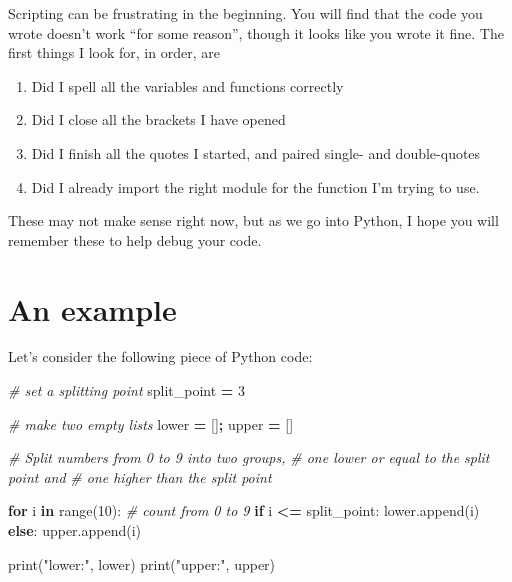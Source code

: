 \documentclass[
  letterpaper,
]{scrbook}
\newenvironment{Shaded}{\begin{snugshade}}{\end{snugshade}}
\newcommand{\BuiltInTok}[1]{#1}
\newcommand{\CommentTok}[1]{\textcolor[rgb]{0.56,0.35,0.01}{\textit{#1}}}
\newcommand{\ControlFlowTok}[1]{\textcolor[rgb]{0.13,0.29,0.53}{\textbf{#1}}}
\newcommand{\DecValTok}[1]{\textcolor[rgb]{0.00,0.00,0.81}{#1}}
\newcommand{\KeywordTok}[1]{\textcolor[rgb]{0.13,0.29,0.53}{\textbf{#1}}}
\newcommand{\NormalTok}[1]{#1}
\newcommand{\OperatorTok}[1]{\textcolor[rgb]{0.81,0.36,0.00}{\textbf{#1}}}
\newcommand{\StringTok}[1]{\textcolor[rgb]{0.31,0.60,0.02}{#1}}
\providecommand{\tightlist}{%
  \setlength{\itemsep}{0pt}\setlength{\parskip}{0pt}}
\begin{document}
Scripting can be frustrating in the beginning. You will find that the code you wrote doesn't work ``for some reason'', though it looks like you wrote it fine. The first things I look for, in order, are

\begin{enumerate}
\def\labelenumi{\arabic{enumi}.}
\tightlist
\item
  Did I spell all the variables and functions correctly
\item
  Did I close all the brackets I have opened
\item
  Did I finish all the quotes I started, and paired single- and double-quotes
\item
  Did I already import the right module for the function I'm trying to use.
\end{enumerate}

These may not make sense right now, but as we go into Python, I hope you will remember these to help debug your code.

\hypertarget{an-example}{%
\section{An example}\label{an-example}}

Let's consider the following piece of Python code:

\begin{Shaded}
\begin{Highlighting}[]
\CommentTok{\# set a splitting point}
\NormalTok{split\_point }\OperatorTok{=} \DecValTok{3}

\CommentTok{\# make two empty lists}
\NormalTok{lower }\OperatorTok{=}\NormalTok{ []}\OperatorTok{;}\NormalTok{ upper }\OperatorTok{=}\NormalTok{ []}

\CommentTok{\# Split numbers from 0 to 9 into two groups, }
\CommentTok{\# one lower or equal to the split point and }
\CommentTok{\# one higher than the split point}

\ControlFlowTok{for}\NormalTok{ i }\KeywordTok{in} \BuiltInTok{range}\NormalTok{(}\DecValTok{10}\NormalTok{):  }\CommentTok{\# count from 0 to 9}
    \ControlFlowTok{if}\NormalTok{ i }\OperatorTok{\textless{}=}\NormalTok{ split\_point:}
\NormalTok{        lower.append(i)}
    \ControlFlowTok{else}\NormalTok{:}
\NormalTok{        upper.append(i)}

\BuiltInTok{print}\NormalTok{(}\StringTok{"lower:"}\NormalTok{, lower)}
\BuiltInTok{print}\NormalTok{(}\StringTok{"upper:"}\NormalTok{, upper)}
\end{Highlighting}
\end{Shaded}
\end{document}
